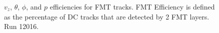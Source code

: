 
    \begin{figure}[t!]
        \centering{}
        \caption[$v_z$, $\theta$, $\phi$, and $p$ efficiencies for FMT tracks, run 12016]{$v_z$, $\theta$, $\phi$, and $p$ efficiencies for FMT tracks. FMT Efficiency is defined as the percentage of DC tracks that are detected by 2 FMT layers. Run 12016.}
        \label{fig::fmt_efficiencies}
    \end{figure}
